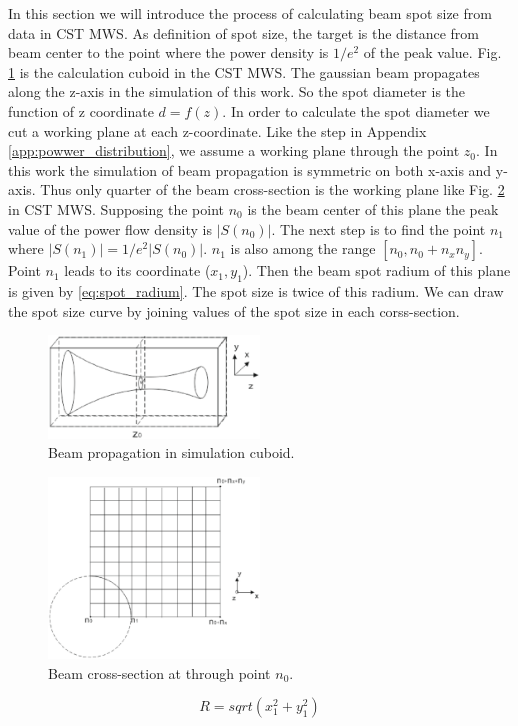 In this section we will introduce the process of calculating beam spot size from data in CST MWS. As definition of spot size, the target is the distance from beam center to the point where the power density is $1/e^{2}$ of the peak value.  Fig. \ref{Afig:beam_cuboid} is the calculation cuboid in the CST MWS. The gaussian beam propagates along the z-axis in the simulation of this work. So the spot diameter is the function of z coordinate $d=f(z)$. In order to calculate the spot diameter we cut a working plane at each z-coordinate. Like the step in Appendix \ref{app:powwer_distribution}, we assume a working plane through the point $z_{0}$. In this work the simulation of beam propagation is symmetric on both x-axis and y-axis. Thus only quarter of the beam cross-section is the working plane like Fig. \ref{Afig:beam_crosssection} in CST MWS. Supposing the point $n_{0}$ is the beam center of this plane the peak value of the power flow density is $|S(n_{0})|$. The next step is to find the point $n_{1}$ where $|S(n_{1})|=1/e^{2}|S(n_{0})|$. $n_{1}$ is also among the range $[n_{0}, n_{0}+n_{x}n_{y}]$. Point $n_{1}$ leads to its coordinate ($x_{1},y_{1}$). Then the beam spot radium of this plane is given by \ref{eq:spot_radium}. The spot size is twice of this radium. We can draw the spot size curve by joining values of the spot size in each corss-section.
\begin{figure}[!ht]
\centering
\includegraphics[width=0.5\textwidth]{bilder/beam_cuboid}
\caption{Beam propagation in simulation cuboid.}
\label{Afig:beam_cuboid}
\end{figure}
\begin{figure}[!ht]
\centering
\includegraphics[width=0.5\textwidth]{bilder/beam_crosssection}
\caption{Beam cross-section at through point $n_{0}$.}
\label{Afig:beam_crosssection}
\end{figure}
\begin{equation}
R=sqrt(x_{1}^{2}+y_{1}^{2})
\label{eq:spot_radium}
\end{equation}
